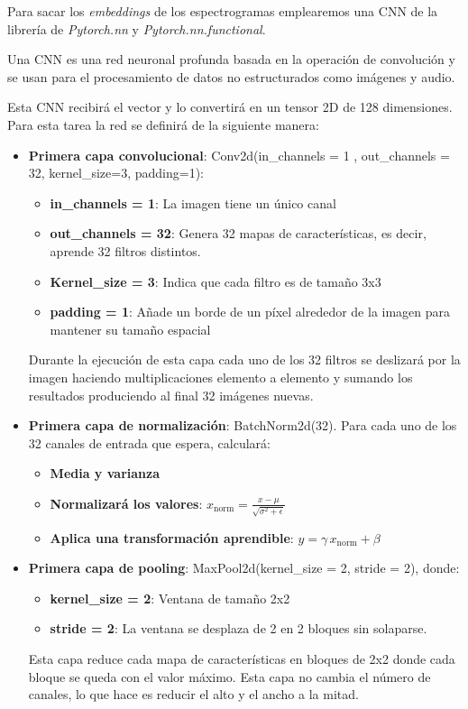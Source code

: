 Para sacar los \textit{embeddings} de los espectrogramas emplearemos una CNN de la librería de \textit{Pytorch.nn} y \textit{Pytorch.nn.functional}.

Una CNN es una red neuronal profunda basada en la operación de convolución y se usan para el procesamiento de datos no estructurados como imágenes y audio.

Esta CNN recibirá el vector y lo convertirá en un tensor 2D de 128 dimensiones. Para esta tarea la red se definirá de la siguiente manera:

\begin{itemize}
	\item \textbf{Primera capa convolucional}: Conv2d(in\_channels = 1 , out\_channels = 32, kernel\_size=3, padding=1):
	  \begin{itemize}
	 	\item \textbf{in\_channels = 1}: La imagen tiene un único canal
	 	\item \textbf{out\_channels = 32}: Genera 32 mapas de características, es decir, aprende 32 filtros distintos.
	 	\item \textbf{Kernel\_size = 3}: Indica que cada filtro es de tamaño 3x3
	 	\item \textbf{padding = 1}: Añade un borde de un píxel alrededor de la imagen para mantener su tamaño espacial
	   \end{itemize}
	
	Durante la ejecución de esta capa cada uno de los 32 filtros se deslizará por la imagen haciendo multiplicaciones elemento a elemento y sumando los resultados produciendo al final 32 imágenes nuevas.
	
	\item \textbf{Primera capa de normalización}: BatchNorm2d(32). Para cada uno de los 32 canales de entrada que espera, calculará:
	  \begin{itemize}
	 	\item \textbf{Media y varianza}
	 	\item \textbf{Normalizará los valores}: $x_{\text{norm}} = \frac{x - \mu}{\sqrt{\sigma^2 + \epsilon}}$
	 	\item \textbf{Aplica una transformación aprendible}: $y = \gamma \, x_{\text{norm}} + \beta$
	  \end{itemize}
	
	\item \textbf{Primera capa de pooling}: MaxPool2d(kernel\_size = 2, stride = 2), donde:
	  \begin{itemize}
	 	\item \textbf{kernel\_size = 2}: Ventana de tamaño 2x2
	 	\item \textbf{stride = 2}: La ventana se desplaza de 2 en 2 bloques sin solaparse.
	  \end{itemize}
	  Esta capa reduce cada mapa de características en bloques de 2x2 donde cada bloque se queda con el valor máximo. Esta capa no cambia el número de canales, lo que hace es reducir el alto y el ancho a la mitad.
	   

\end{itemize}
